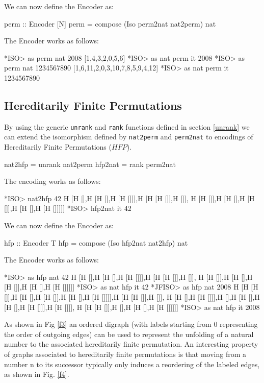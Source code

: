 \documentclass[]{INCLUDES/llncs}
\begin{document}
We can now define the Encoder as:
\begin{code}
perm :: Encoder [N]
perm = compose (Iso perm2nat nat2perm) nat
\end{code}
The Encoder works as follows:
\begin{codex}
*ISO> as perm nat 2008
[1,4,3,2,0,5,6]
*ISO> as nat perm it
2008
*ISO> as perm nat 1234567890
[1,6,11,2,0,3,10,7,8,5,9,4,12]
*ISO> as nat perm it
1234567890
\end{codex}

\subsection{Hereditarily Finite Permutations}

By using the generic {\tt unrank} and {\tt rank} functions defined 
in section \ref{unrank} we can extend the isomorphism defined by {\tt nat2perm}
and {\tt perm2nat} to encodings of Hereditarily Finite Permutations ($HFP$).
\begin{code}
nat2hfp = unrank nat2perm
hfp2nat = rank perm2nat
\end{code}
The encoding works  as follows:
\begin{codex}
*ISO> nat2hfp 42
H [H [],H [H [],H [H []]],H [H [H []],H []],
   H [H []],H [H [],H [H []],H [H [],H [H []]]]]
*ISO> hfp2nat it
  42
\end{codex}
We can now define the Encoder as:
\begin{code}
hfp :: Encoder T
hfp = compose (Iso hfp2nat nat2hfp) nat
\end{code}
The Encoder works as follows:
\begin{codex}
*ISO> as hfp nat 42
H [H [],H [H [],H [H []]],H [H [H []],H []],
   H [H []],H [H [],H [H []],H [H [],H [H []]]]]
*ISO> as nat hfp it
42
*JFISO> as hfp nat 2008
H [H [H []],H [H [],H [H []],H [H [],H [H []]]],H [H [H []],H []],
  H [H [],H [H []]],H [],H [H [],H [H [],H [H []]],H [H []]],
  H [H [H []],H [],H [H [],H [H []]]]]
*ISO> as nat hfp it
2008
\end{codex}
As shown in Fig \ref{f3} an ordered digraph (with labels starting from 0
representing the order of outgoing edges) can be used to represent the unfolding
of a natural number to the associated hereditarily finite permutation.
An interesting property of graphs associated to hereditarily finite permutations
is that moving from a number n to its successor typically only induces a
reordering of the labeled edges, as shown in Fig. \ref{f4}.
\end{document}

